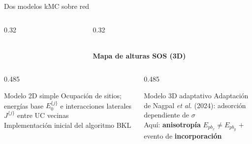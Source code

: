 \documentclass[aspectratio=169,11pt]{beamer}
\begin{document}
\begin{frame}{Dos modelos kMC sobre red}
\begin{columns}[T,onlytextwidth]
\begin{column}{0.32\textwidth}
    \end{column}
    \begin{column}{0.32\textwidth}
      \centering
      \\[0.2em]
      {\color{azul}\bfseries\small Mapa de alturas SOS (3D)}\par
    \end{column}
  \end{columns}
  \vspace{0.5em}
  \begin{columns}[T,onlytextwidth]
    \begin{column}{0.485\textwidth}
      \begin{block}{Modelo 2D simple}
        \footnotesize Ocupación de sitios; energías base $E_0^{\{j\}}$ e interacciones
        laterales $J^{\{j\}}$ entre UC vecinas\\
        Implementación inicial del algoritmo BKL
      \end{block}
    \end{column}
    \begin{column}{0.485\textwidth}
      \begin{block}{Modelo 3D adaptativo}
        \footnotesize Adaptación de Nagpal \emph{et al.} (2024): adsorción dependiente de $\sigma$\\
        Aquí: \textbf{anisotropía} $E_{pb_x}\neq E_{pb_y}$ $+$ evento de \textbf{incorporación}
      \end{block}
    \end{column}
  \end{columns}
  \vspace{0.3em}
\end{frame}
\end{document}
